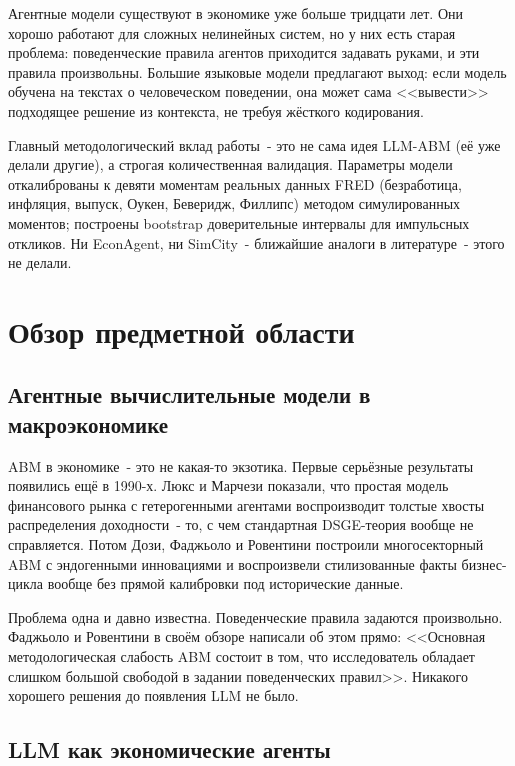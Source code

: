 \documentclass[12pt, a4paper]{article}
\begin{document}
Агентные модели существуют в экономике уже больше тридцати лет. Они хорошо работают для сложных нелинейных систем, но у них есть старая проблема: поведенческие правила агентов приходится задавать руками, и эти правила произвольны. Большие языковые модели предлагают выход: если модель обучена на текстах о человеческом поведении, она может сама <<вывести>> подходящее решение из контекста, не требуя жёсткого кодирования.

Главный методологический вклад работы~- это не сама идея LLM-ABM (её уже делали другие), а строгая количественная валидация. Параметры модели откалиброваны к девяти моментам реальных данных FRED (безработица, инфляция, выпуск, Оукен, Беверидж, Филлипс) методом симулированных моментов; построены bootstrap доверительные интервалы для импульсных откликов. Ни EconAgent, ни SimCity~- ближайшие аналоги в литературе~- этого не делали.

\section{Обзор предметной области}

\subsection{Агентные вычислительные модели в макроэкономике}

ABM в экономике~- это не какая-то экзотика. Первые серьёзные результаты появились ещё в 1990-х. Люкс и Марчези \cite{lux1999} показали, что простая модель финансового рынка с гетерогенными агентами воспроизводит толстые хвосты распределения доходности~- то, с чем стандартная DSGE-теория вообще не справляется. Потом Дози, Фаджьоло и Ровентини \cite{dosi2010} построили многосекторный ABM с эндогенными инновациями и воспроизвели стилизованные факты бизнес-цикла вообще без прямой калибровки под исторические данные.

Проблема одна и давно известна. Поведенческие правила задаются произвольно. Фаджьоло и Ровентини \cite{fagiolo2017} в своём обзоре написали об этом прямо: <<Основная методологическая слабость ABM состоит в том, что исследователь обладает слишком большой свободой в задании поведенческих правил>>. Никакого хорошего решения до появления LLM не было.

\subsection{LLM как экономические агенты}
\end{document}
